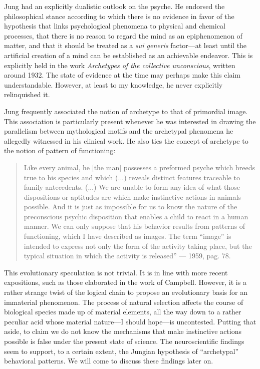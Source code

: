 \documentclass[a4paper]{article}
\begin{document}
    Jung had an explicitly dualistic outlook on the psyche. He endorsed
    the philosophical stance according to which there is no evidence in favor of
    the hypothesis that links psychological phenomena to physical and chemical
    processes, that there is no reason to regard the mind as an epiphenomenon of
    matter, and that it should be treated as a \textit{sui generis} factor—at least
    until the artificial creation of a mind can be established as an achievable
    endeavor. This is explicitly held in the work \textit{Archetypes of the collective
    unconscious}, written around 1932. The state of evidence at the time may
    perhaps make this claim understandable. However, at least to my
    knowledge, he never explicitly relinquished it. 

    Jung frequently associated
    the notion of archetype to that of primordial image. This association is
    particularly present whenever he was interested in drawing the parallelism
    between mythological motifs and the archetypal phenomena he allegedly
    witnessed in his clinical work. He also ties the concept of archetype to the
    notion of pattern of functioning: 

    \begin{quote}
    Like every animal, he [the man] possesses
    a preformed psyche which breeds true to his species and which (...) reveals
    distinct features traceable to family antecedents. (...) We are unable to
    form any idea of what those dispositions or aptitudes are which make
    instinctive actions in animals possible. And it is just as impossible for us
    to know the nature of the preconscious psychic disposition that enables a
    child to react in a human manner. We can only suppose that his behavior
    results from patterns of functioning, which I have described as images. The
    term “image” is intended to express not only the form of the activity taking
    place, but the typical situation in which the activity is released” — 1959,
    pag. 78. 
    \end{quote}

    This evolutionary speculation is not trivial. It is in line with
    more recent expositions, such as those elaborated in the work of Campbell.
    However, it is a rather strange twist of the logical chain to propose an
    evolutionary basis for an immaterial phenomenon. The process of natural
    selection affects the course of biological species made up of material
    elements, all the way down to a rather peculiar acid whose material nature—I
    should hope—is uncontested. Putting that aside, to claim we do not know the
    mechanisms that make instinctive actions possible is false under the present
    state of science. The neuroscientific findings seem to support, to a
    certain extent, the Jungian hypothesis of “archetypal” behavioral patterns.
    We will come to discuss these findings later on. 
\end{document}
